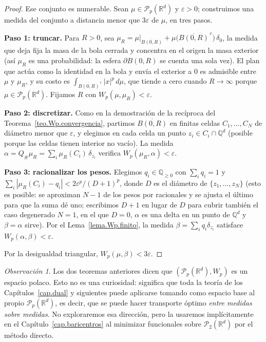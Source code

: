 \documentclass[12pt, a4paper]{amsbook}
\newcommand{\R}{{\mathbb R}}
\newcommand{\Q}{{\mathbb Q}}
\theoremstyle{remark}
\newtheorem{obs}[teo]{Observación}
\theoremstyle{definition}
\numberwithin{section}{chapter}
\numberwithin{subsection}{section}
\numberwithin{equation}{section}
\numberwithin{figure}{chapter}
\begin{document}
\begin{proof}
Ese conjunto es numerable. Sean $\mu\in\mathcal P_p(\R^d)$ y $\varepsilon>0$;
construimos una medida del conjunto a distancia menor que $3\varepsilon$ de
$\mu$, en tres pasos.

\medskip
\textbf{Paso 1: truncar.} Para $R>0$, sea
$\mu_R=\mu|_{\overline{B(0,R)}}+\mu\bigl(\overline{B(0,R)}^{\,c}\bigr)\,\delta_0$,
la medida que deja fija la masa de la bola cerrada y concentra en el origen
la masa exterior (así $\mu_R$ es una probabilidad: la esfera
$\partial B(0,R)$ se cuenta una sola vez). El plan
que actúa como la identidad en la bola y envía el exterior a $0$ es
admisible entre $\mu$ y $\mu_R$, y su costo es
$\int_{\overline{B(0,R)}^{\,c}}|x|^p\,d\mu$,
que tiende a cero cuando $R\to\infty$ porque $\mu\in\mathcal P_p(\R^d)$.
Fijamos $R$ con $W_p(\mu,\mu_R)<\varepsilon$.

\medskip
\textbf{Paso 2: discretizar.} Como en la demostración de la recíproca del
Teorema~\ref{teo.Wp.convergencia}, partimos $\overline{B(0,R)}$ en finitas
celdas $C_1,\dots,C_N$ de diámetro menor que $\varepsilon$, y elegimos en cada
celda un punto $z_i\in C_i\cap\Q^d$ (posible porque las celdas tienen interior
no vacío). La medida $\alpha=Q_\#\mu_R=\sum_i\mu_R(C_i)\,\delta_{z_i}$
verifica $W_p(\mu_R,\alpha)<\varepsilon$.

\medskip
\textbf{Paso 3: racionalizar los pesos.} Elegimos $q_i\in\Q_{\ge0}$ con
$\sum_iq_i=1$ y $\sum_i|\mu_R(C_i)-q_i|<2\varepsilon^p/(D+1)^p$, donde $D$ es
el diámetro de $\{z_1,\dots,z_N\}$ (esto es posible: se aproximan $N-1$ de los
pesos por racionales y se ajusta el último para que la suma dé uno;
escribimos $D+1$ en lugar de $D$ para cubrir también el caso degenerado
$N=1$, en el que $D=0$, $\alpha$ es una delta en un punto de $\Q^d$ y
$\beta=\alpha$ sirve). Por el
Lema~\ref{lema.Wp.finito}, la medida $\beta=\sum_iq_i\delta_{z_i}$ satisface
$W_p(\alpha,\beta)<\varepsilon$.

\medskip
Por la desigualdad triangular, $W_p(\mu,\beta)<3\varepsilon$.
\end{proof}

\begin{obs}
Los dos teoremas anteriores dicen que $(\mathcal P_p(\R^d),W_p)$ es un espacio
polaco. Esto no es una curiosidad: significa que toda la teoría de los
Capítulos~\ref{cap.dual} y siguientes puede aplicarse tomando como espacio
base al propio $\mathcal P_p(\R^d)$, es decir, que se puede hacer transporte
óptimo \emph{entre medidas sobre medidas}. No exploraremos esa dirección, pero
la usaremos implícitamente en el Capítulo~\ref{cap.baricentros} al minimizar
funcionales sobre $\mathcal P_2(\R^d)$ por el método directo.
\end{obs}
\end{document}
